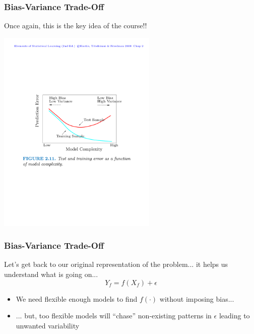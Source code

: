 \documentclass[flegn]{beamer}
\begin{document}
\begin{frame}
\frametitle{Bias-Variance Trade-Off}

Once again, this is the key idea of the course!!

\vspace{-0.1cm}
\begin{center}
\includegraphics[width=3in]{ESL_2-11}
\end{center}

\end{frame}



\begin{frame}
\frametitle{Bias-Variance Trade-Off}

Let's get back to our original representation of the problem... it helps us understand what is going on...
$$
Y_f = f(X_f) + \epsilon
$$
\begin{itemize}
\item We need flexible enough models to find $f(\cdot)$ without imposing bias...
\item ... but, too flexible models will ``chase'' non-existing patterns in $\epsilon$ leading to unwanted variability
\end{itemize}

\end{frame}
\end{document}
